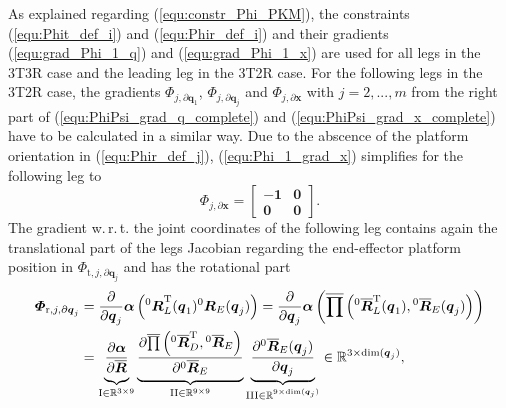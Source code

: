 \documentclass[robotics,article,submit,moreauthors,pdftex]{Definitions/mdpi}
\newcommand{\bm}[1]{\boldsymbol{#1}}
\newcommand{\rotmat}[2]{{{ }^{#1}\boldsymbol{R}}_{#2}}
\newcommand{\rotmato}[2]{{{ }^{#1}\boldsymbol{\overline{R}}}_{#2}}
\newcommand{\transp}[0]{{\mathrm{T}}}
\let\Phi\varPhi
\begin{document}
As explained regarding (\ref{equ:constr_Phi_PKM}), the constraints (\ref{equ:Phit_def_i}) and (\ref{equ:Phir_def_i}) and their gradients (\ref{equ:grad_Phi_1_q}) and (\ref{equ:grad_Phi_1_x}) are used for all legs in the 3T3R case and the leading leg in the 3T2R case.
For the following legs in the 3T2R case, the gradients $\bm{\Phi}_{j,\partial\bm{q}_1}$, $\bm{\Phi}_{j,\partial\bm{q}_j}$ and $\bm{\Phi}_{j,\partial\bm{x}}$ with $j=2,...,m$ from the right part of  (\ref{equ:PhiPsi_grad_q_complete}) and (\ref{equ:PhiPsi_grad_x_complete}) have to be calculated in a similar way. 
Due to the abscence of the platform orientation in (\ref{equ:Phir_def_j}), (\ref{equ:Phi_1_grad_x}) simplifies for the following leg to 
%
\vspace{-0.1cm}
\begin{equation}
\bm{\Phi}_{j,\partial\bm{x}}
=
\begin{bmatrix}
-\bm{1} & \bm{0} \\
\bm{0} & \bm{0}
\end{bmatrix}.
\end{equation}
%
The gradient w.\,r.\,t. the joint coordinates of the following leg contains again the translational part of the legs Jacobian regarding the end-effector platform position in $\bm{\Phi}_{\mathrm{t},j,\partial\bm{q}_j}$ and has the rotational part
%
\begin{align}
\bm{\Phi}_{\mathrm{r},j,\partial\bm{q}_j}
&=
\frac{\partial}{\partial \bm{q}_j} \bm{\alpha}\left(\rotmat{0}{L}^\transp(\bm{q}_1) \rotmat{0}{E}(\bm{q}_j)\right)
=
\frac{\partial}{\partial \bm{q}_j} \bm{\alpha}\left(\overline{\prod}\left( \rotmato{0}{L}^\transp(\bm{q}_1), \rotmato{0}{E}(\bm{q}_j)\right)\right)  \label{equ:grad_Phi_j_qj}\\
&=
\underbrace{
	\vphantom{\frac{\partial \rotmato{0}{E}(\bm{q}_j)}{\partial \bm{q}_j}}
	\frac{\partial \bm{\alpha}}{\partial \overline{\bm{R}}}
	}_{\mathrm{I} \in {\mathbb{R}}^{3 \times 9}}
\underbrace{
	\vphantom{\frac{\partial \rotmato{0}{E}(\bm{q}_j)}{\partial \bm{q}_j}}
	\frac{\partial \overline{\prod}\left(\rotmato{0}{D}^\transp, \rotmato{0}{E}\right)}{\partial \rotmato{0}{E}}
	}_{\mathrm{II} \in {\mathbb{R}}^{9 \times 9}}
\underbrace{
	\frac{\partial \rotmato{0}{E}(\bm{q}_j)}{\partial \bm{q}_j}
	}_{\mathrm{III} \in {\mathbb{R}}^{9 \times \mathrm{dim}(\bm{q}_j)}}
\in {\mathbb{R}}^{3 \times \mathrm{dim}(\bm{q}_j)}, \nonumber
\end{align}
\end{document}
